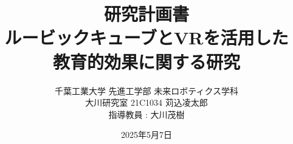 \documentclass[uplatex,landscape]{jsarticle}
\begin{document}
 
\title{\large 研究計画書\\
\huge ルービックキューブとVRを活用した\\ 教育的効果に関する研究}
\author{千葉工業大学 先進工学部 未来ロボティクス学科\\
大川研究室 21C1034 苅込凌太郎\\
\small 指導教員 : 大川茂樹}
\date{2025年5月7日} 
\maketitle









\end{document}
